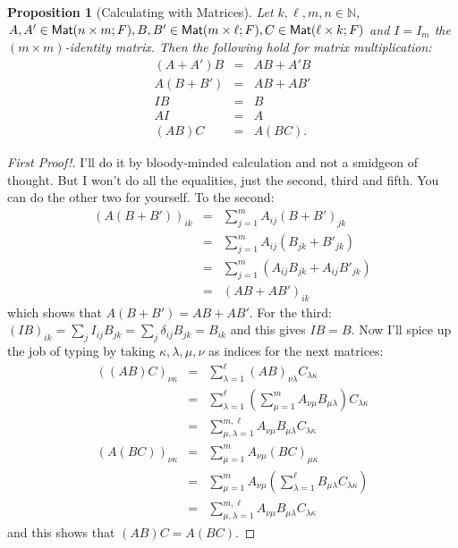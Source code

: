\documentclass[11pt]{amsbook}
\newtheorem{proposition}[theorem]{Proposition}
\theoremstyle{definition}
\begin{document}
\begin{proposition}[Calculating with Matrices] \label{matmakesring} Let $k, \ell, m, n\in \mathbb{N}$, $A,A'\in {\sf Mat}(n\times m; F), B,B'\in {\sf Mat}(m\times \ell; F), C\in {\sf Mat}(\ell \times k; F)$ and $I = I_m$ the $(m\times m)$-identity matrix. Then the following hold for matrix multiplication:
\begin{eqnarray*}
(A+A')B & = & AB + A'B \\ A(B+B') &=& AB + AB' \\ IB &=& B \\ AI &=& A \\ (AB)C &=& A(BC). \end{eqnarray*}
\end{proposition}
\begin{proof}[First Proof!] I'll do it by bloody-minded calculation and not a smidgeon of thought. But I won't do all the equalities, just the second, third and fifth. You can do the other two for yourself. To the second:
\begin{eqnarray*}
(A(B+B'))_{ik} &=& \sum_{j=1}^m A_{ij}(B+B')_{jk} \\ & = &\sum_{j=1}^m A_{ij}(B_{jk}+B'_{jk}) \\ & = & \sum_{j=1}^m (A_{ij}B_{jk} + A_{ij}B'_{jk})\\ & = & (AB + AB')_{ik}
\end{eqnarray*}
which shows that $A(B+B') = AB + AB'$. For the third: $(IB)_{ik} = \sum_{j} I_{ij}B_{jk} = \sum_j \delta_{ij}B_{jk} = B_{ik}$ and this gives $IB = B$. Now I'll spice up the job of typing by taking $\kappa, \lambda, \mu , \nu$ as indices for the next matrices:
\begin{eqnarray*}
((AB)C)_{\nu\kappa} &=& \sum_{\lambda=1}^{\ell} (AB)_{\nu \lambda}C_{\lambda \kappa} \\ & = & \sum_{\lambda=1}^{\ell} (\sum_{\mu=1}^m A_{\nu \mu}B_{\mu \lambda})C_{\lambda \kappa} \\ & = & \sum_{\mu, \lambda = 1}^{m,\ell} A_{\nu\mu}B_{\mu \lambda} C_{\lambda \kappa} \\
(A(BC))_{\nu \kappa} & = & \sum_{\mu =1}^m A_{\nu \mu}(BC)_{\mu \kappa} \\ & = & \sum_{\mu=1}^m A_{\nu \mu}\left(\sum_{\lambda = 1}^{\ell} B_{\mu \lambda}C_{\lambda \kappa}\right) \\ & = & \sum_{\mu, \lambda = 1}^{m,\ell} A_{\nu\mu}B_{\mu\lambda}C_{\lambda\kappa}
\end{eqnarray*}
and this shows that $(AB)C = A(BC)$.
\end{proof}
\end{document}
